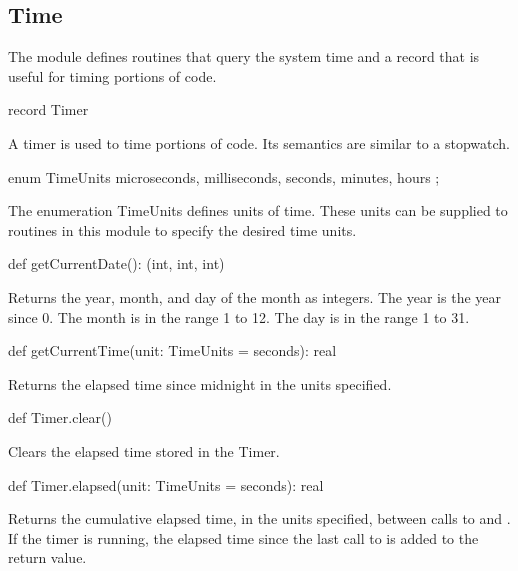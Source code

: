 \subsection{Time}
\label{Time}

The module  defines routines that query the system time and
a record  that is useful for timing portions of code.

\vspace{1pc}

\begin{protohead}
record Timer
\end{protohead}
\begin{protobody}
A timer is used to time portions of code.  Its semantics are similar
to a stopwatch.
\end{protobody}

\begin{protohead}
enum TimeUnits { microseconds, milliseconds, seconds, minutes, hours };
\end{protohead}
\begin{protobody}
The enumeration TimeUnits defines units of time.  These units can be
supplied to routines in this module to specify the desired time units.
\end{protobody}

\begin{protohead}
def getCurrentDate(): (int, int, int)
\end{protohead}
\begin{protobody}
Returns the year, month, and day of the month as integers.  The year
is the year since 0.  The month is in the range 1 to 12.  The day is
in the range 1 to 31.
\end{protobody}

\begin{protohead}
def getCurrentTime(unit: TimeUnits = seconds): real
\end{protohead}
\begin{protobody}
Returns the elapsed time since midnight in the units specified.
\end{protobody}

\begin{protohead}
def Timer.clear()
\end{protohead}
\begin{protobody}
Clears the elapsed time stored in the Timer.
\end{protobody}

\begin{protohead}
def Timer.elapsed(unit: TimeUnits = seconds): real
\end{protohead}
\begin{protobody}
Returns the cumulative elapsed time, in the units specified, between
calls to  and .  If the timer is running, the
elapsed time since the last call to  is added to the
return value.
\end{protobody}

